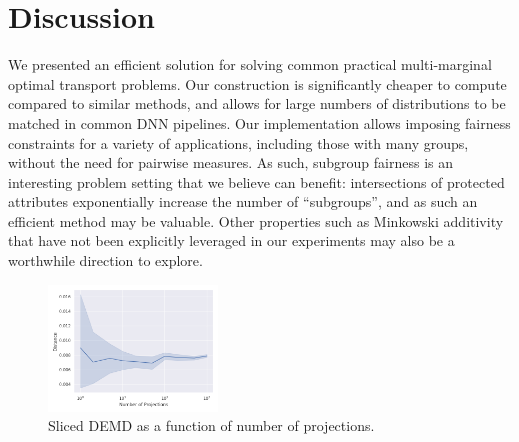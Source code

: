 \section{Discussion}
We presented an efficient solution for solving common practical multi-marginal optimal transport problems.
Our construction is significantly cheaper to compute compared to similar methods,
and allows for large numbers of distributions to be matched in common DNN pipelines. 
Our implementation allows imposing fairness constraints for a variety of applications, including those with many groups, without the need for pairwise measures.
As such, subgroup fairness \citep{kearns2018preventing} is an interesting problem setting that we believe can benefit:
intersections of protected attributes exponentially increase the number of ``subgroups'',
and as such an efficient method may be valuable.
Other properties such as 
Minkowski additivity that have not been 
explicitly leveraged in our experiments may also be a worthwhile direction to explore.
\begin{figure}
    \centering
    \includegraphics[width=0.4\textwidth]{6_demd/figs/sliced/demd_multidim_proj_convergence_CelebA.png}
    \caption{Sliced DEMD as a function of number of projections.}
    \label{fig:sliced}
\end{figure}

